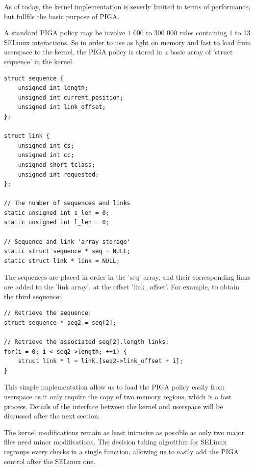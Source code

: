 \documentclass[pdftex,a4paper,titlepage,11pt]{article}
\begin{document}
As of today, the kernel implementation is severly limited in terms of
performance, but fullfils the basic purpose of PIGA.

\bigskip

A standard PIGA policy may be involve 1 000 to 300 000 rules containing 1 to 13
SELinux interactions. So in order to use as light on memory and fast to load
from userspace to the kernel, the PIGA policy is stored in a basic array of
'struct sequence' in the kernel.

\begin{lstlisting}
struct sequence {
	unsigned int length;
	unsigned int current_position;
	unsigned int link_offset;
};

struct link {
	unsigned int cs;
	unsigned int cc;
	unsigned short tclass;
	unsigned int requested;
};

// The number of sequences and links
static unsigned int s_len = 0;
static unsigned int l_len = 0;

// Sequence and link 'array storage'
static struct sequence * seq = NULL;
static struct link * link = NULL;
\end{lstlisting}

\smallskip

The sequences are placed in order in the 'seq' array, and their corresponding
links are added to the 'link array', at the offset 'link\_offset'. For example,
to obtain the third sequence:

\begin{lstlisting}
// Retrieve the sequence:
struct sequence * seq2 = seq[2];

// Retrieve the associated seq[2].length links:
for(i = 0; i < seq2->length; ++i) {
	struct link * l = link.[seq2->link_offset + i];
}
\end{lstlisting}

\smallskip

This simple implementation allow us to load the PIGA policy easily from
userspace as it only require the copy of two memory regions, which is a fast
process. Details of the interface between the kernel and userspace will be
discussed after the next section.

\bigskip

The kernel modifications remain as least intrusive as possible as only two major
files need minor modifications. The decision taking algorithm for SELinux
regroups every checks in a single function, allowing us to easily add the PIGA
control after the SELinux one.
\end{document}
